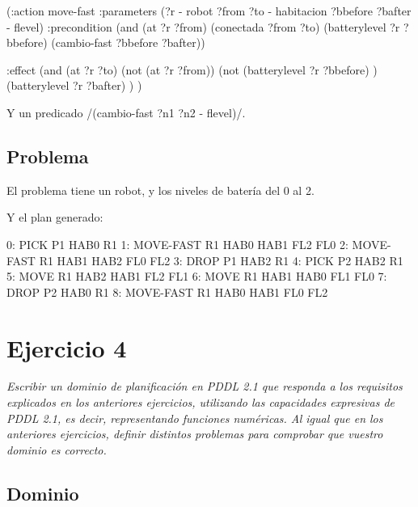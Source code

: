 \documentclass[	DIV=calc,%
							paper=a4,%
							fontsize=11pt]{scrartcl}	 					%
\newcommand{\lispscript}[2]{
    \myLisp[label=#2]{#1}
}
\begin{document}
\begin{newlispcode}
	(:action move-fast
	  :parameters (?r - robot ?from ?to - habitacion ?bbefore ?bafter - flevel)
	  :precondition (and
	                  (at ?r ?from)
	                  (conectada ?from ?to)
	                  (batterylevel ?r ?bbefore)
	                  (cambio-fast ?bbefore ?bafter))

	  :effect (and
	            (at ?r ?to)
	            (not (at ?r ?from))
	            (not (batterylevel ?r ?bbefore) )
	            (batterylevel ?r ?bafter)
	            )
	)
\end{newlispcode}

Y un predicado \newlispinline/(cambio-fast ?n1 ?n2 - flevel)/.

\subsection{Problema}
\label{sub:Problema}

El problema tiene un robot, y los niveles de batería del 0 al 2.

\lispscript{../p0e3.pddl}{p0e3.pddl}

Y el plan generado:

\begin{bashcode}
	        0: PICK P1 HAB0 R1
	        1: MOVE-FAST R1 HAB0 HAB1 FL2 FL0
	        2: MOVE-FAST R1 HAB1 HAB2 FL0 FL2
	        3: DROP P1 HAB2 R1
	        4: PICK P2 HAB2 R1
	        5: MOVE R1 HAB2 HAB1 FL2 FL1
	        6: MOVE R1 HAB1 HAB0 FL1 FL0
	        7: DROP P2 HAB0 R1
	        8: MOVE-FAST R1 HAB0 HAB1 FL0 FL2
\end{bashcode}

\section{Ejercicio 4}
\label{sec:Ejercicio 4}

\textit{Escribir un dominio de planificación en PDDL 2.1 que responda a los requisitos
explicados en los anteriores ejercicios, utilizando las capacidades expresivas de PDDL
2.1, es decir, representando funciones numéricas. Al igual que en los anteriores
ejercicios, definir distintos problemas para comprobar que vuestro dominio es
correcto.}

\subsection{Dominio}
\label{sub:Dominio}
\end{document}
